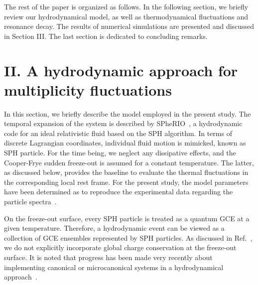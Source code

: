 \documentclass[secnumarabic, graphics,floatfix, nofootinbib,tightenlines,nobibnotes, aps, prl, 12pt]{revtex4-1}
\begin{document}
The rest of the paper is organized as follows.
In the following section, we briefly review our hydrodynamical model, as well as thermodynamical fluctuations and resonance decay.
The results of numerical simulations are presented and discussed in Section III.
The last section is dedicated to concluding remarks.

\section{II. A hydrodynamic approach for multiplicity fluctuations}

In this section, we briefly describe the model employed in the present study.
The temporal expansion of the system is described by SPheRIO~\cite{sph-review-01}, a hydrodynamic code for an ideal relativistic fluid based on the SPH algorithm. 
In terms of discrete Lagrangian coordinates, individual fluid motion is mimicked, known as SPH particle. 
For the time being, we neglect any dissipative effects, and the Cooper-Frye sudden freeze-out is assumed for a constant temperature.
The latter, as discussed below, provides the baseline to evaluate the thermal fluctuations in the corresponding local rest frame. 
For the present study, the model parameters have been determined as to reproduce the experimental data regarding the particle spectra~\cite{sph-eos-02,sph-vn-04,sph-v2-02,sph-corr-ev-04,sph-eos-03,sph-vn-04,sph-corr-ev-06,sph-corr-ev-08,sph-corr-ev-09}.

On the freeze-out surface, every SPH particle is treated as a quantum GCE at a given temperature.
Therefore, a hydrodynamic event can be viewed as a collection of GCE ensembles represented by SPH particles.
As discussed in Ref.~\cite{sph-bes-01}, we do not explicitly incorporate global charge conservation at the freeze-out surface. 
It is noted that progress has been made very recently about implementing canonical or microcanonical systems in a hydrodynamical approach~\cite{hydro-fluctuations-04}.
\end{document}

